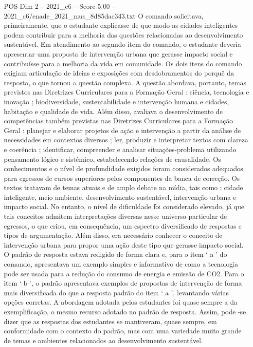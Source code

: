 \begin{textsample}{POS Dim 2 – 2021\_c6 – Score 5.00 – 2021\_c6/enade\_2021\_mus\_8d85dac343.txt}
O comando solicitava, primeiramente, que o estudante explicasse de que modo as cidades inteligentes podem contribuir para a melhoria das questões relacionadas ao desenvolvimento sustentável.
Em atendimento ao segundo item do comando, o estudante deveria apresentar uma proposta de intervenção urbana que gerasse impacto social e contribuísse para a melhoria da vida em comunidade.
Os dois itens do comando exigiam articulação de ideias e exposições com desdobramentos do porquê da resposta, o que tornou a questão complexa.
A questão abordava, portanto, temas previstos nas Diretrizes Curriculares para a Formação Geral : ciência, tecnologia e inovação ; biodiversidade, sustentabilidade e intervenção humana e cidades, habitação e qualidade de vida.
Além disso, avaliava o desenvolvimento de competências também previstas nas Diretrizes Curriculares para a Formação Geral : planejar e elaborar projetos de ação e intervenção a partir da análise de necessidades em contextos diversos ; ler, produzir e interpretar textos com clareza e coerência ; identificar, compreender e analisar situações-problema utilizando pensamento lógico e sistêmico, estabelecendo relações de causalidade.
Os conhecimentos e o nível de profundidade exigidos foram considerados adequados para egressos de cursos superiores pelos componentes da banca de correção.
Os textos tratavam de temas atuais e de amplo debate na mídia, tais como : cidade inteligente, meio ambiente, desenvolvimento sustentável, intervenção urbana e impacto social.
No entanto, o nível de dificuldade foi considerado elevado, já que tais conceitos admitem interpretações diversas nesse universo particular de egressos, o que criou, em consequência, um espectro diversificado de respostas e tipos de argumentação.
Além disso, era necessário conhecer o conceito de intervenção urbana para propor uma ação deste tipo que gerasse impacto social.
O padrão de resposta estava redigido de forma clara e, para o item ‘ a ’ do comando, apresentava um exemplo simples e informativo de como a tecnologia pode ser usada para a redução do consumo de energia e emissão de CO2.
Para o item ‘ b ’, o padrão apresentava exemplos de propostas de intervenção de forma mais diversificada do que a resposta padrão do item ‘ a ’, levantando várias opções corretas.
A abordagem adotada pelos estudantes foi quase sempre a da exemplificação, o mesmo recurso adotado no padrão de resposta.
Assim, pode -se dizer que as respostas dos estudantes se mantiveram, quase sempre, em conformidade com o contexto do padrão, mas com uma variedade muito grande de temas e ambientes relacionados ao desenvolvimento sustentável.

\end{textsample}
